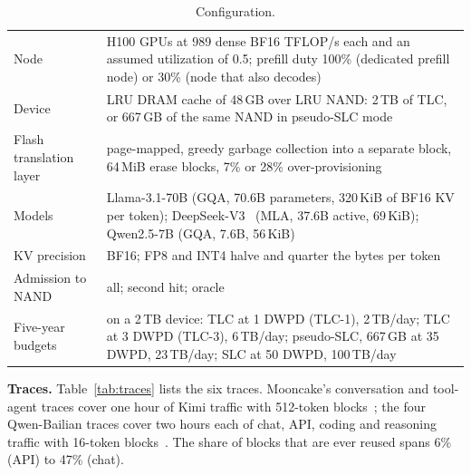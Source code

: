 \documentclass[acmsmall,screen,review]{acmart}
\begin{document}
\begin{table}[t]
\caption{Configuration.}
\label{tab:config}
\small
\begin{tabular}{@{}>{\raggedright}p{3.3cm}>{\raggedright\arraybackslash}p{10.2cm}@{}}
\toprule
Node & 8 H100 GPUs at 989 dense BF16 TFLOP/s each and an assumed utilization of 0.5; prefill duty 100\%
(dedicated prefill node) or 30\% (node that also decodes) \\
Device & LRU DRAM cache of 48\,GB over LRU NAND: 2\,TB of TLC, or 667\,GB of the same NAND in
pseudo-SLC mode \\
Flash translation layer & page-mapped, greedy garbage collection into a separate block, 64\,MiB
erase blocks, 7\% or 28\% over-provisioning \\
Models & Llama-3.1-70B (GQA, 70.6B parameters, 320\,KiB of BF16 KV per token);
DeepSeek-V3~\cite{deepseekv3} (MLA,
37.6B active, 69\,KiB); Qwen2.5-7B (GQA, 7.6B, 56\,KiB) \\
KV precision & BF16; FP8 and INT4 halve and quarter the bytes per token \\
Admission to NAND & all; second hit; oracle \\
Five-year budgets & on a 2\,TB device: TLC at 1 DWPD (TLC-1), 2\,TB/day; TLC at 3 DWPD (TLC-3),
6\,TB/day; pseudo-SLC, 667\,GB at 35 DWPD, 23\,TB/day; SLC at 50 DWPD, 100\,TB/day \\
\bottomrule
\end{tabular}
\end{table}

\textbf{Traces.} Table~\ref{tab:traces} lists the six traces. Mooncake's conversation and
tool-agent traces cover one hour of Kimi traffic with 512-token blocks~\cite{mooncake}; the four
Qwen-Bailian traces cover two hours each of chat, API, coding and reasoning traffic with 16-token
blocks~\cite{bailian}. The share of blocks that are ever reused spans 6\% (API) to 47\% (chat).

\begin{table}[t]
\caption{Production traces. Blocks reused: share of unique blocks referenced again later.}
\label{tab:traces}
\resizebox{\textwidth}{!}{}
\end{table}
\end{document}
